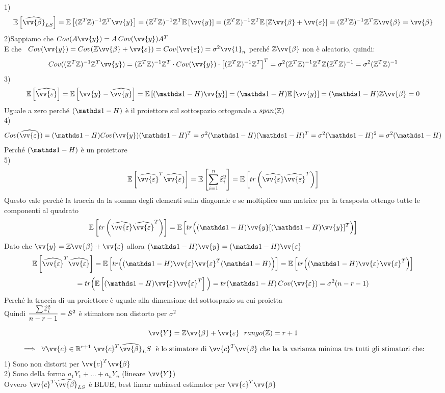 \begin{Dim}
    1)
    \[
    \E{\hat{\vv{\beta}}_{LS}}= \E{(\ZZ^T\ZZ)^{-1}\ZZ^T\vv{y}}=(\ZZ^T\ZZ)^{-1}\ZZ^T \E{\vv{y}} = (\ZZ^T\ZZ)^{-1}\ZZ^T \E{\ZZ \vv{\beta} + \vv{\eps}} = (\ZZ^T\ZZ)^{-1}\ZZ^T \ZZ \vv{\beta} = \vv{\beta}
    \]
    2)Sappiamo che $Cov(A\vv{y})=A\,Cov(\vv{y})A^T$ \\ E che \ $Cov(\vv{y})= Cov(\ZZ\vv{\beta}+\vv{\eps}) = Cov(\vv{\eps}) = \sigma^2 \vv{1}_n$ perché $\ZZ\vv{\beta}$ non è aleatorio, quindi:
    \[
    Cov((\ZZ^T\ZZ)^{-1}\ZZ^T\vv{y}) = (\ZZ^T\ZZ)^{-1}\ZZ^T \cdot Cov(\vv{y})\cdot \OO (\ZZ^T\ZZ)^{-1}\ZZ^T \CC^T = \sigma^2 (\ZZ^T\ZZ)^{-1}\ZZ^T \ZZ(\ZZ^T\ZZ)^{-1} = \sigma^2(\ZZ^T\ZZ)^{-1}
    \]
    3)
    \[
    \E{\hat{\vv{\eps}}} = \E{\vv{y}-\hat{\vv{y}}} = \E{(\II-H)\vv{y}}= (\II-H)\E{\vv{y}} = (\II-H)\ZZ\vv{\beta} =0
    \]
    Uguale a zero perché $(\II-H)$ è il proiettore sul sottospazio ortogonale a $span(\mathbb Z)$\\
    4)
    \[
    Cov(\hat{\vv{\eps}}) = (\II-H) Cov(\vv{y})(\II-H)^T = \sigma^2 (\II-H)(\II-H)^T = \sigma^2(\II-H)^2=\sigma^2(\II-H)
    \]
    Perché $(\II-H)$ è un proiettore\\
    5)
    \[
    \E{\hat{\vv{\eps}}^T\hat{\vv{\eps}}} = \E{\Sum{i=1}{n} \hat{\eps}^2_i} = \E{tr\O\hat{\vv{\eps}}\hat{\vv{\eps}}^T\C}
    \]
    Questo vale perché la traccia da la somma degli elementi sulla diagonale e se moltiplico una matrice per la trasposta ottengo tutte le componenti al quadrato
    \[
    \E{tr\O\hat{\vv{\eps}}\hat{\vv{\eps}}^T\C} = \E{tr\Big((\II-H)\vv{y}[(\II-H)\vv{y}]^T \Big)}
    \]
    Dato che $\vv{y}=\ZZ\vv{\beta} + \vv{\eps}$ allora $(\II-H)\vv{y} = (\II-H)\vv{\eps}$
    \[
    \E{\hat{\vv{\eps}}^T\hat{\vv{\eps}}} = \E{tr\Big( (\II-H)\vv{\eps}\vv{\eps}^T(\II-H) \Big)} = \E{tr\Big( (\II-H)\vv{\eps}\vv{\eps}^T \Big)}\]
    \[= tr\Big( \E{(\II-H)\vv{\eps}\vv{\eps}^T} \Big) = tr(\II-H)\, Cov(\vv{\eps})= \sigma^2(n-r-1)
    \]
    Perché la traccia di un proiettore è uguale alla dimensione del sottospazio su cui proietta\\
    Quindi $\dfrac{\sum \widehat{\varepsilon}_i^2}{n-r-1}=S^2$ è stimatore non distorto per $\sigma^2$
\end{Dim}

\phantom{}

\begin{teo}
    \[\vv{Y} = \ZZ \vv{\beta} + \vv{\eps} \ \
    rango(\ZZ)=r+1\]
    \[
    \implies \ \forall \vv{c}\in \R^{r+1} \ \vv{c}^T\hat{\vv{\beta}}_LS \ \text{ è lo stimatore di } \vv{c}^T\vv{\beta} \text{ che ha la varianza minima tra tutti gli stimatori che:}
    \]
    1) Sono non distorti per $\vv{c}^T\vv{\beta}$\\
    2) Sono della forma $a_1Y_1+...+a_nY_n$ (lineare $\vv{Y}$)\\
    Ovvero $\vv{c}^T\hat{\vv{\beta}}_{LS}$ è BLUE, best linear unbiased estimator per $\vv{c}^T\vv{\beta}$
\end{teo}


